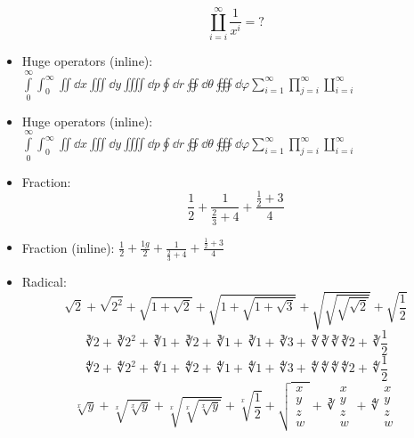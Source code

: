 \documentclass { article }
\begin{document}
\begin{itemize}
\[          \coprod_{i=i}^\infty \frac{1}{x^i} = ?
        \]
  \item Huge operators (inline):
        $ \int\limits_0^\infty \int_0^\infty \iint \dd{x} \iiint \dd{y} \iiiint \dd{p}
          \oint \dd{r} \oiint \dd{\theta} \oiiint \dd{\varphi}
          \sum_{i=1}^\infty \prod_{j=i}^\infty \coprod_{i=i}^\infty $
  \item Huge operators (inline):
        \begingroup
          $ \int\limits_0^\infty \int_0^\infty \iint \dd{x} \iiint \dd{y} \iiiint \dd{p}
            \oint \dd{r} \oiint \dd{\theta} \oiiint \dd{\varphi}
            \sum_{i=1}^\infty \prod_{j=i}^\infty \coprod_{i=i}^\infty $
        \endgroup
  \item Fraction:
        \[ \frac{1}{2} + \frac{1}{\frac{2}{3}+4} + \frac{\frac{1}{2}+3}{4} \]
  \item Fraction (inline):
        $ \frac{1}{2} + \frac{1g}{2} + \frac{1}{\frac{2}{3}+4} + \frac{\frac{1}{2}+3}{4} $
  \item Radical:
        \[
            \sqrt{2} + \sqrt{2^2} + \sqrt{1+\sqrt{2}} + \sqrt{1+\sqrt{1+\sqrt{3}}}
          + \sqrt{\sqrt{\sqrt{\sqrt{2}}}} + \sqrt{\frac{1}{2}}
        \]
        \[
            \cuberoot{2} + \cuberoot{2^2} + \cuberoot{1+\cuberoot{2}}
          + \cuberoot{1+\cuberoot{1+\cuberoot{3}}}
          + \cuberoot{\cuberoot{\cuberoot{\cuberoot{2}}}} + \cuberoot{\frac{1}{2}}
        \]
        \[
            \fourthroot{2} + \fourthroot{2^2} + \fourthroot{1+\fourthroot{2}}
          + \fourthroot{1+\fourthroot{1+\fourthroot{3}}}
          + \fourthroot{\fourthroot{\fourthroot{\fourthroot{2}}}} + \fourthroot{\frac{1}{2}}
        \]
        \[
            \sqrt[x]{y} + \sqrt[x]{\sqrt[x]{y}} + \sqrt[x]{\sqrt[x]{\sqrt[x]{y}}}
          + \sqrt[x]{\frac{1}{2}}
          + \sqrt      { \begin{matrix} x \\ y \\ z \\ w \end{matrix} }
          + \cuberoot  { \begin{matrix} x \\ y \\ z \\ w \end{matrix} }
          + \fourthroot{ \begin{matrix} x \\ y \\ z \\ w \end{matrix} }
\]
\end{itemize}
\end{document}
